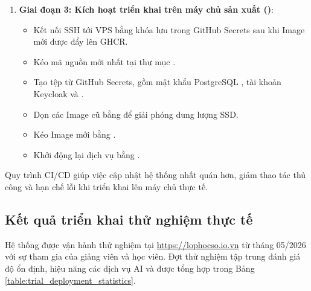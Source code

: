 \documentclass[../DoAn.tex]{subfiles}
\begin{document}
\begin{enumerate}
    \item \textbf{Giai đoạn 3: Kích hoạt triển khai trên máy chủ sản xuất ()}:
    \begin{itemize}
        \item Kết nối SSH tới VPS bằng khóa lưu trong GitHub Secrets sau khi Image mới được đẩy lên GHCR.
        \item Kéo mã nguồn mới nhất tại thư mục .
        \item Tạo tệp  từ GitHub Secrets, gồm mật khẩu PostgreSQL \cite{postgresql_docs2026}, tài khoản Keycloak \cite{keycloak2026} và .
        \item Dọn các Image cũ bằng     để giải phóng dung lượng SSD.
        \item Kéo Image mới bằng   .
        \item Khởi động lại dịch vụ bằng       .
    \end{itemize}
\end{enumerate}

Quy trình CI/CD giúp việc cập nhật hệ thống nhất quán hơn, giảm thao tác thủ công và hạn chế lỗi khi triển khai lên máy chủ thực tế.

\subsection{Kết quả triển khai thử nghiệm thực tế}
\label{subsection:4.5.4}

Hệ thống được vận hành thử nghiệm tại \url{https://lophocso.io.vn} từ tháng 05/2026 với sự tham gia của giảng viên và học viên. Đợt thử nghiệm tập trung đánh giá độ ổn định, hiệu năng các dịch vụ AI và được tổng hợp trong Bảng \ref{table:trial_deployment_statistics}.
\end{document}
